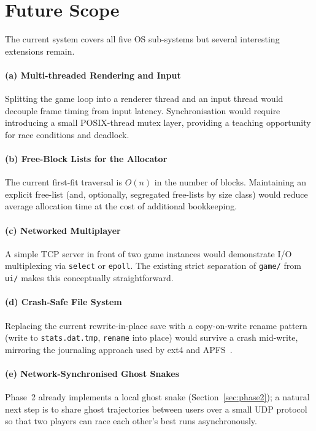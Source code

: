 \documentclass[conference]{IEEEtran}
\begin{document}
\section{Future Scope}
\label{sec:future}

The current system covers all five OS sub-systems but several interesting extensions remain.

\paragraph{(a) Multi-threaded Rendering and Input}
Splitting the game loop into a renderer thread and an input thread would decouple frame timing from input latency. Synchronisation would require introducing a small POSIX-thread mutex layer, providing a teaching opportunity for race conditions and deadlock.

\paragraph{(b) Free-Block Lists for the Allocator}
The current first-fit traversal is $O(n)$ in the number of blocks. Maintaining an explicit free-list (and, optionally, segregated free-lists by size class) would reduce average allocation time at the cost of additional bookkeeping.

\paragraph{(c) Networked Multiplayer}
A simple TCP server in front of two game instances would demonstrate I/O multiplexing via \texttt{select} or \texttt{epoll}. The existing strict separation of \texttt{game/} from \texttt{ui/} makes this conceptually straightforward.

\paragraph{(d) Crash-Safe File System}
Replacing the current rewrite-in-place save with a copy-on-write rename pattern (write to \texttt{stats.dat.tmp}, \texttt{rename} into place) would survive a crash mid-write, mirroring the journaling approach used by ext4 and APFS~\cite{silberschatz2018}.

\paragraph{(e) Network-Synchronised Ghost Snakes}
Phase~2 already implements a local ghost snake (Section~\ref{sec:phase2}); a natural next step is to share ghost trajectories between users over a small UDP protocol so that two players can race each other's best runs asynchronously.
\end{document}
